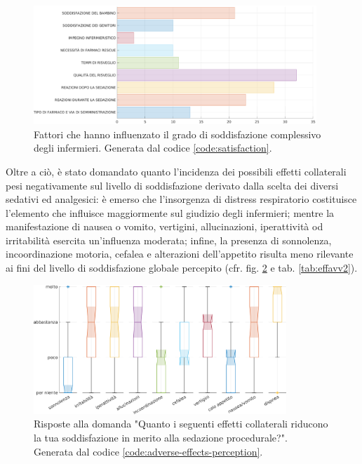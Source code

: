 \begin{figure}[!h]
    \centering
    \includegraphics[width=0.95\textwidth]{Figure/soddisfazione-globale.eps}
    \caption{Fattori che hanno influenzato il grado di soddisfazione complessivo degli infermieri. Generata dal codice \ref{code:satisfaction}.}
    \label{fig:soddglobale}
\end{figure}

Oltre a ciò, è stato domandato quanto l'incidenza dei possibili effetti collaterali pesi negativamente sul livello di soddisfazione derivato dalla scelta dei diversi sedativi ed analgesici: è emerso che l'insorgenza di distress respiratorio costituisce l'elemento che influisce maggiormente sul giudizio degli infermieri; mentre la manifestazione di nausea o vomito, vertigini, allucinazioni, iperattività od irritabilità esercita un'influenza moderata; infine, la presenza di sonnolenza, incoordinazione motoria, cefalea e alterazioni dell'appetito risulta meno rilevante ai fini del livello di soddisfazione globale percepito (cfr. fig. \ref{fig:influenzaeffetti} e tab. \ref{tab:effavv2}). 

\vfill

\begin{figure}[!ht]
    \centering
    \includegraphics[width=0.85\textwidth]{Figure/influenza-effetti.png}
    \caption{Risposte alla domanda "Quanto i seguenti effetti collaterali riducono la tua soddisfazione in merito alla sedazione procedurale?".\\ Generata dal codice \ref{code:adverse-effects-perception}.}
    \label{fig:influenzaeffetti}
\end{figure}

